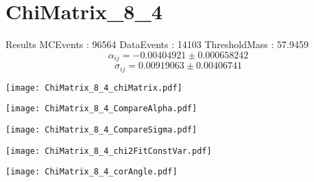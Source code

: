 \documentclass[a4paper,12pt]{article}
\begin{document}
\section{ChiMatrix\_8\_4}
\begin{minipage}{0.49\linewidth} Results \newline
MCEvents : 96564\newline
DataEvents : 14103 \newline
ThresholdMass : 57.9459\\
$$\alpha_{ij} = -0.00404921\pm 0.000658242$$
$$\sigma_{ij} = 0.00919063\pm 0.00406741$$
\end{minipage}\hfill
\begin{minipage}{0.49\linewidth} 
\texttt{[image: ChiMatrix\_8\_4\_chiMatrix.pdf]}\\
\end{minipage}
\hfill
\begin{minipage}{0.49\linewidth} 
\texttt{[image: ChiMatrix\_8\_4\_CompareAlpha.pdf]}\\
\end{minipage}
\hfill
\begin{minipage}{0.49\linewidth} 
\texttt{[image: ChiMatrix\_8\_4\_CompareSigma.pdf]}\\
\end{minipage}
\begin{minipage}{0.49\linewidth} 
\texttt{[image: ChiMatrix\_8\_4\_chi2FitConstVar.pdf]}\\
\end{minipage}
\hfill
\begin{minipage}{0.49\linewidth} 
\texttt{[image: ChiMatrix\_8\_4\_corAngle.pdf]}\\
\end{minipage}
\end{document}
